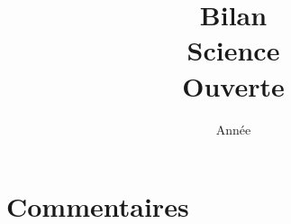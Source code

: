 \documentclass[french,11pt]{dibiso/biso}
\title{Bilan \\ Science \\ Ouverte}
\subtitle{\tuttiReportTitle}
\date{Année \tuttiCfgYear}
\date{}
\begin{document}
\maketitle

\clearpage
\section*{Commentaires}
\end{document}

